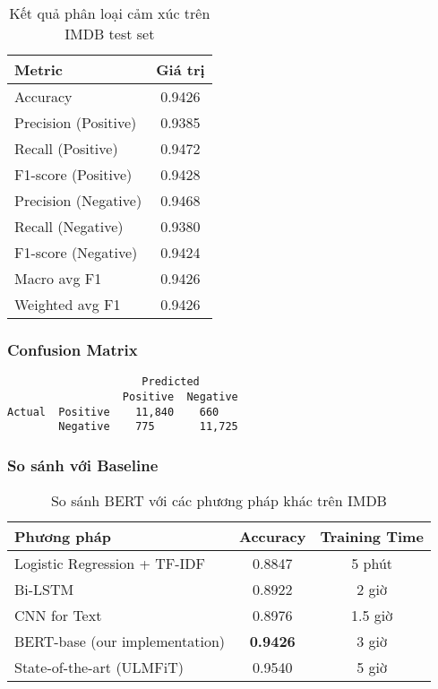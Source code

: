 \begin{table}[H]
    \centering
    \caption{Kết quả phân loại cảm xúc trên IMDB test set}
    \label{tab:imdb_results_actual}
    \begin{tabular}{lc}
        \toprule
        \textbf{Metric} & \textbf{Giá trị} \\
        \midrule
        Accuracy & 0.9426 \\
        Precision (Positive) & 0.9385 \\
        Recall (Positive) & 0.9472 \\
        F1-score (Positive) & 0.9428 \\
        Precision (Negative) & 0.9468 \\
        Recall (Negative) & 0.9380 \\
        F1-score (Negative) & 0.9424 \\
        \midrule
        Macro avg F1 & 0.9426 \\
        Weighted avg F1 & 0.9426 \\
        \bottomrule
    \end{tabular}
\end{table}

\subsubsection{Confusion Matrix}
\begin{verbatim}
                     Predicted
                  Positive  Negative
Actual  Positive    11,840    660
        Negative    775       11,725
\end{verbatim}

\subsubsection{So sánh với Baseline}
\begin{table}[H]
    \centering
    \caption{So sánh BERT với các phương pháp khác trên IMDB}
    \label{tab:comparison_methods}
    \begin{tabular}{lcc}
        \toprule
        \textbf{Phương pháp} & \textbf{Accuracy} & \textbf{Training Time} \\
        \midrule
        Logistic Regression + TF-IDF & 0.8847 & 5 phút \\
        Bi-LSTM & 0.8922 & 2 giờ \\
        CNN for Text & 0.8976 & 1.5 giờ \\
        BERT-base (our implementation) & \textbf{0.9426} & 3 giờ \\
        \midrule
        State-of-the-art (ULMFiT) & 0.9540 & 5 giờ \\
        \bottomrule
    \end{tabular}
\end{table}

